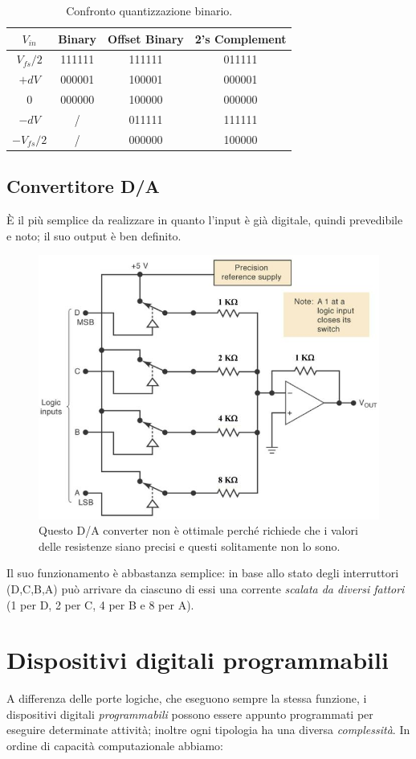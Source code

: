 \documentclass[
]{book}
\begin{document}
\begin{table}[H]
\centering
\begin{tabular}{cccc}
\hline
$V_{in}$ & Binary & Offset Binary & 2's Complement \\ 
\hline
$V_{fs}/2$ & 111111 & 111111 & 011111 \\
\hline
$+dV$ & 000001 & 100001 & 000001 \\
0 & 000000 & 100000 & 000000 \\
$-dV$ & / & 011111 & 111111 \\
\hline
$-V_{fs}/2$ & / & 000000 & 100000
\end{tabular}
\caption{Confronto quantizzazione binario.}
\end{table}

\section{Convertitore D/A}\label{convertitore-da}

È il più semplice da realizzare in quanto l'input è già digitale, quindi
prevedibile e noto; il suo output è ben definito.

\begin{figure}
\centering
\includegraphics[width=0.4\linewidth,height=\textheight,keepaspectratio]{immagini/41.png}
\caption{Questo D/A converter non è ottimale perché richiede che i
valori delle resistenze siano precisi e questi solitamente non lo sono.}
\end{figure}

Il suo funzionamento è abbastanza semplice: in base allo stato degli
interruttori (D,C,B,A) può arrivare da ciascuno di essi una corrente
\emph{scalata da diversi fattori} (1 per D, 2 per C, 4 per B e 8 per A).

\chapter{Dispositivi digitali
programmabili}\label{dispositivi-digitali-programmabili}

A differenza delle porte logiche, che eseguono sempre la stessa
funzione, i dispositivi digitali \emph{programmabili} possono essere
appunto programmati per eseguire determinate attività; inoltre ogni
tipologia ha una diversa \emph{complessità}. In ordine di capacità
computazionale abbiamo:
\end{document}
